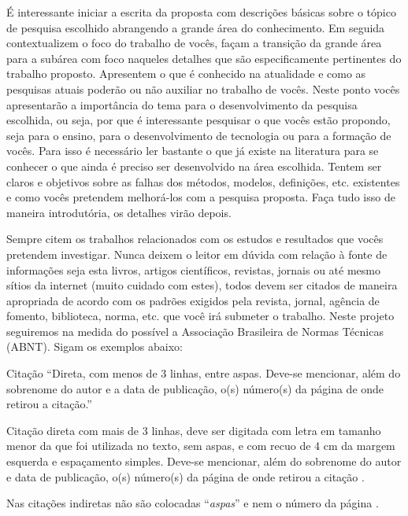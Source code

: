 \documentclass[12pt,oneside,brazil,hidelinks,article,sumario=tradicional,a4paper]{abntex2}
\begin{document}
É interessante iniciar a escrita da proposta com descrições básicas sobre o tópico de pesquisa escolhido abrangendo a grande área do conhecimento. Em seguida contextualizem o foco do trabalho de vocês, façam a transição da grande área para a subárea com foco naqueles detalhes que são especificamente pertinentes do trabalho proposto. Apresentem o que é conhecido na atualidade e como as pesquisas atuais poderão ou não auxiliar no trabalho de vocês. Neste ponto vocês apresentarão a importância do tema para o desenvolvimento da pesquisa escolhida, ou seja, por que é interessante pesquisar o que vocês estão propondo, seja para o ensino, para o desenvolvimento de tecnologia ou para a formação de vocês. Para isso é necessário ler bastante o que já existe na literatura para se conhecer o que ainda é preciso ser desenvolvido na área escolhida. Tentem ser claros e objetivos sobre as falhas dos métodos, modelos, definições, etc. existentes e como vocês pretendem melhorá-los com a pesquisa proposta. Faça tudo isso de maneira introdutória, os detalhes virão depois.

Sempre citem os trabalhos relacionados com os estudos e resultados que vocês pretendem investigar. Nunca deixem o leitor em dúvida com relação à fonte de informações seja esta livros, artigos científicos, revistas, jornais ou até mesmo sítios da internet (muito cuidado com estes), todos devem ser citados de maneira apropriada de acordo com os padrões exigidos pela revista, jornal, agência de fomento, biblioteca, norma, etc. que você irá submeter o trabalho. Neste projeto seguiremos na medida do possível a Associação Brasileira de Normas Técnicas (ABNT). Sigam os exemplos abaixo:

{\color{red}Citação ``Direta, com menos de 3 linhas, entre aspas. Deve-se mencionar, além do sobrenome do autor e a data de publicação, o(s) número(s) da página de onde retirou a citação.'' \cite[p. 32]{Collobert2011}}

\begin{citacao}
  \color{red}
  Citação direta com mais de 3 linhas, deve ser digitada com letra em tamanho menor da que foi utilizada no texto, sem aspas, e com recuo de 4 cm da margem esquerda e espaçamento simples. Deve-se mencionar, além do sobrenome do autor e data de publicação, o(s) número(s) da página de onde retirou a citação \cite[p. 32]{Collobert2011}.
\end{citacao}

{\color{red}Nas citações indiretas não são colocadas ``\emph{aspas}'' e nem o número da página \cite{Collobert2011}.}
\end{document}
